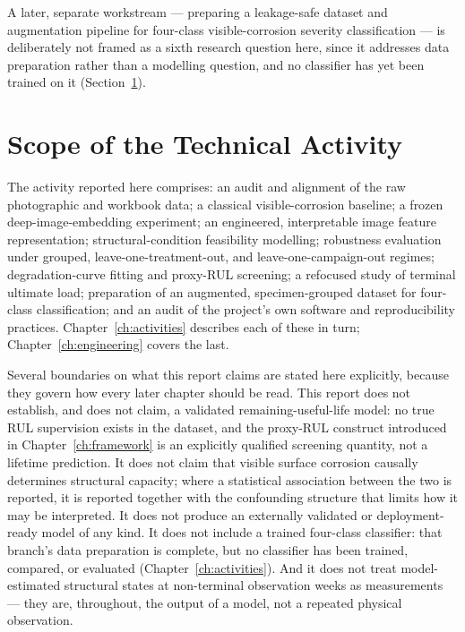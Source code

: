 A later, separate workstream — preparing a leakage-safe dataset and
augmentation pipeline for four-class visible-corrosion severity
classification — is deliberately not framed as a sixth research question
here, since it addresses data preparation rather than a modelling
question, and no classifier has yet been trained on it
(Section~\ref{sec:intro-scope}).

\section{Scope of the Technical Activity}
\label{sec:intro-scope}

The activity reported here comprises: an audit and alignment of the raw
photographic and workbook data; a classical visible-corrosion baseline; a
frozen deep-image-embedding experiment; an engineered, interpretable image
feature representation; structural-condition feasibility modelling;
robustness evaluation under grouped, leave-one-treatment-out, and
leave-one-campaign-out regimes; degradation-curve fitting and proxy-RUL
screening; a refocused study of terminal ultimate load; preparation of an
augmented, specimen-grouped dataset for four-class classification; and an
audit of the project's own software and reproducibility practices.
Chapter~\ref{ch:activities} describes each of these in turn;
Chapter~\ref{ch:engineering} covers the last.

Several boundaries on what this report claims are stated here explicitly,
because they govern how every later chapter should be read. This report
does not establish, and does not claim, a validated remaining-useful-life
model: no true RUL supervision exists in the dataset, and the
proxy-RUL construct introduced in Chapter~\ref{ch:framework} is an
explicitly qualified screening quantity, not a lifetime prediction. It
does not claim that visible surface corrosion causally determines
structural capacity; where a statistical association between the two is
reported, it is reported together with the confounding structure that
limits how it may be interpreted. It does not produce an externally
validated or deployment-ready model of any kind. It does not include a
trained four-class classifier: that branch's data preparation is complete,
but no classifier has been trained, compared, or evaluated
(Chapter~\ref{ch:activities}). And it does not treat model-estimated
structural states at non-terminal observation weeks as measurements — they
are, throughout, the output of a model, not a repeated physical
observation.

